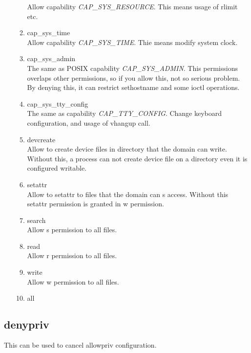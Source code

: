 \documentclass{article}
\begin{document}
\begin{itemize}
\begin{enumerate}
	      Allow capability {\it CAP\_SYS\_RESOURCE}. This means usage
	      of rlimit etc.
	\item cap\_sys\_time\\
	      Allow capability {\it CAP\_SYS\_TIME}. Thie means modify
	      system clock.
	\item cap\_sys\_admin\\
	      The same as POSIX capability {\it CAP\_SYS\_ADMIN}. This
	      permissions overlaps other permissions, so if you allow
	      this, not so serious problem. By denying this,
	      it can restrict sethostname and some ioctl operations.
	\item cap\_sys\_tty\_config\\
	      The same as capability {\it CAP\_TTY\_CONFIG}. Change
	      keyboard configuration, and usage of vhangup call. 
	\item devcreate\\
	      Allow to create device files in directory that the domain can write.
	      Without this, a process can not create device
	      file on a directory even it is configured writable.
	\item setattr\\
	      Allow to setattr to files that the domain can s
	      access. Without this setattr permission is granted in w permission.	\item search\\
	      Allow s permission to all files.
	\item read\\
	      Allow r permission to all files.
	\item write\\
	      Allow w permission to all files.
	\item all\\
       \end{enumerate}     
\end{itemize}
\subsection{denypriv}
This can be used to cancel allowpriv configuration.
\end{document}

